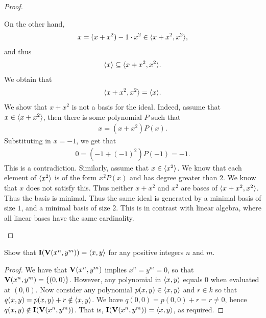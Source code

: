 \begin{proof}
\begin{enumerate}
    On the other hand,
    \begin{align*}
        x = (x+x^2) - 1\cdot x^2 \in \langle x+x^2, x^2\rangle,
    \end{align*}
    and thus
    \begin{align*}
        \langle x\rangle \subseteq \langle x+x^2, x^2\rangle.
    \end{align*}
    We obtain that
    \begin{align*}
        \langle x+x^2, x^2\rangle = \langle x\rangle.
    \end{align*}
    We show that $x+x^2$ is not a basis for the ideal. 
    Indeed, assume that $x\in \langle x+x^2\rangle$, then there is some polynomial $P$ such that
    \begin{align*}
        x = (x + x^2)P(x).
    \end{align*}
    Substituting in $x=-1$, we get that
    \begin{align*}
        0 = (-1 + (-1)^2)P(-1) = -1.
    \end{align*}
    This is a contradiction. 
    Similarly, assume that $x \in \langle x^2\rangle$. 
    We know that each element of $\langle x^2\rangle$ is of the form $x^2 P(x)$ and has degree greater than $2$. 
    We know that $x$ does not satisfy this. 
    Thus neither $x+x^2$ and $x^2$ are bases of $\langle x+x^2, x^2\rangle$. 
    Thus the basis is minimal. 
    Thus the same ideal is generated by a minimal basis of size $1$, and a minimal basis of size $2$. 
    This is in contrast with linear algebra, where all linear bases have the same cardinality.
    \end{enumerate}
\end{proof}

\begin{exercise}{7}
Show that $\mathbf{I}(\mathbf{V}(x^n,y^m))=\langle x,y\rangle$ for any positive integers $n$ and $m$.
\end{exercise}
\begin{proof}
We have that $\mathbf{V}(x^n,y^m)$ implies $x^n=y^m=0$, so that $\mathbf{V}(x^n,y^m)=\{(0,0)\}$. 
However, any polynomial in $\langle x,y\rangle$ equals 0 when evaluated at $(0,0)$. 
Now consider any polynomial $p(x,y) \in \langle x,y\rangle$ and $r\in k$ so that $q(x,y) = p(x,y)+r\notin\langle x,y\rangle$. 
We have $q(0,0) = p(0,0)+r = r\neq 0$, hence $q(x,y) \notin \mathbf{I}(\mathbf{V}(x^n,y^m))$. 
That is, $\mathbf{I}(\mathbf{V}(x^n,y^m)) = \langle x,y\rangle$, as required.
\end{proof}

